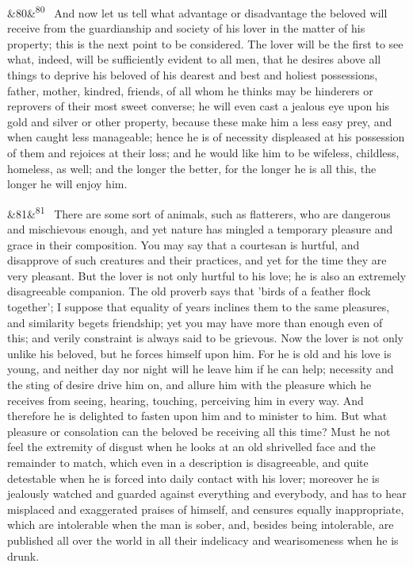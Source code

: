 \documentclass[12pt]{article}
\newcommand{\para}[1][]{\par\noindent\ifx&#1&\else\textsuperscript{\footnotesize #1}~\fi}
\begin{document}
\para[80] And now let us tell what advantage or disadvantage the beloved will receive from the guardianship and society of his lover in the matter of his property; this is the next point to be considered. The lover will be the first to see what, indeed, will be sufficiently evident to all men, that he desires above all things to deprive his beloved of his dearest and best and holiest possessions, father, mother, kindred, friends, of all whom he thinks may be hinderers or reprovers of their most sweet converse; he will even cast a jealous eye upon his gold and silver or other property, because these make him a less easy prey, and when caught less manageable; hence he is of necessity displeased at his possession of them and rejoices at their loss; and he would like him to be wifeless, childless, homeless, as well; and the longer the better, for the longer he is all this, the longer he will enjoy him.

\para[81] There are some sort of animals, such as flatterers, who are dangerous and mischievous enough, and yet nature has mingled a temporary pleasure and grace in their composition. You may say that a courtesan is hurtful, and disapprove of such creatures and their practices, and yet for the time they are very pleasant. But the lover is not only hurtful to his love; he is also an extremely disagreeable companion. The old proverb says that 'birds of a feather flock together'; I suppose that equality of years inclines them to the same pleasures, and similarity begets friendship; yet you may have more than enough even of this; and verily constraint is always said to be grievous. Now the lover is not only unlike his beloved, but he forces himself upon him. For he is old and his love is young, and neither day nor night will he leave him if he can help; necessity and the sting of desire drive him on, and allure him with the pleasure which he receives from seeing, hearing, touching, perceiving him in every way. And therefore he is delighted to fasten upon him and to minister to him. But what pleasure or consolation can the beloved be receiving all this time? Must he not feel the extremity of disgust when he looks at an old shrivelled face and the remainder to match, which even in a description is disagreeable, and quite detestable when he is forced into daily contact with his lover; moreover he is jealously watched and guarded against everything and everybody, and has to hear misplaced and exaggerated praises of himself, and censures equally inappropriate, which are intolerable when the man is sober, and, besides being intolerable, are published all over the world in all their indelicacy and wearisomeness when he is drunk.
\end{document}
